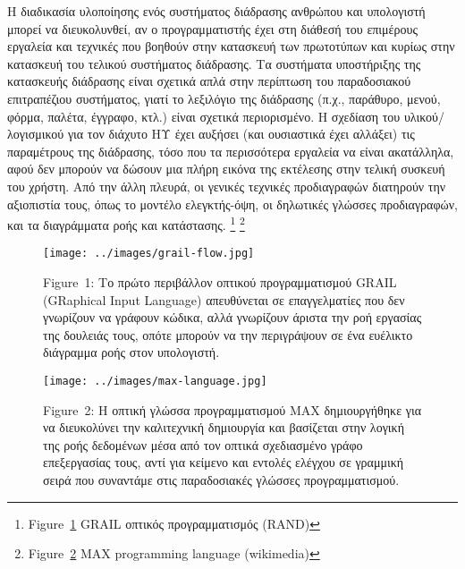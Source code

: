 \documentclass[
]{article}
\begin{document}
Η διαδικασία υλοποίησης ενός συστήματος διάδρασης ανθρώπου και
υπολογιστή μπορεί να διευκολυνθεί, αν ο προγραμματιστής έχει στη διάθεσή
του επιμέρους εργαλεία και τεχνικές που βοηθούν στην κατασκευή των
πρωτοτύπων και κυρίως στην κατασκευή του τελικού συστήματος διάδρασης.
Τα συστήματα υποστήριξης της κατασκευής διάδρασης είναι σχετικά απλά
στην περίπτωση του παραδοσιακού επιτραπέζιου συστήματος, γιατί το
λεξιλόγιο της διάδρασης (π.χ., παράθυρο, μενού, φόρμα, παλέτα, έγγραφο,
κτλ.) είναι σχετικά περιορισμένο. Η σχεδίαση του υλικού/λογισμικού για
τον διάχυτο ΗΥ έχει αυξήσει (και ουσιαστικά έχει αλλάξει) τις
παραμέτρους της διάδρασης, τόσο που τα περισσότερα εργαλεία να είναι
ακατάλληλα, αφού δεν μπορούν να δώσουν μια πλήρη εικόνα της εκτέλεσης
στην τελική συσκευή του χρήστη. Από την άλλη πλευρά, οι γενικές τεχνικές
προδιαγραφών διατηρούν την αξιοπιστία τους, όπως το μοντέλο
ελεγκτής-όψη, οι δηλωτικές γλώσσες προδιαγραφών, και τα διαγράμματα ροής
και κατάστασης. \footnote{Figure~\protect\hyperlink{fig:grail-flow}{1}
  GRAIL οπτικός προγραμματισμός (RAND)} \footnote{Figure~\protect\hyperlink{fig:max-language}{2}
  MAX programming language (wikimedia)}

\leavevmode{}%
\begin{figure}
\hypertarget{fig:grail-flow}{%
\centering
\texttt{[image: ../images/grail-flow.jpg]}
\caption{Figure~1: Το πρώτο περιβάλλον οπτικού προγραμματισμού GRAIL
(GRaphical Input Language) απευθύνεται σε επαγγελματίες που δεν
γνωρίζουν να γράφουν κώδικα, αλλά γνωρίζουν άριστα την ροή εργασίας της
δουλειάς τους, οπότε μπορούν να την περιγράψουν σε ένα ευέλικτο
διάγραμμα ροής στον υπολογιστή.}\label{fig:grail-flow}
}
\end{figure}

\leavevmode{}%
\begin{figure}
\hypertarget{fig:max-language}{%
\centering
\texttt{[image: ../images/max-language.jpg]}
\caption{Figure~2: Η οπτική γλώσσα προγραμματισμού MAX δημιουργήθηκε για
να διευκολύνει την καλιτεχνική δημιουργία και βασίζεται στην λογική της
ροής δεδομένων μέσα από τον οπτικά σχεδιασμένο γράφο επεξεργασίας τους,
αντί για κείμενο και εντολές ελέγχου σε γραμμική σειρά που συναντάμε
στις παραδοσιακές γλώσσες προγραμματισμού.}\label{fig:max-language}
}
\end{figure}
\end{document}
